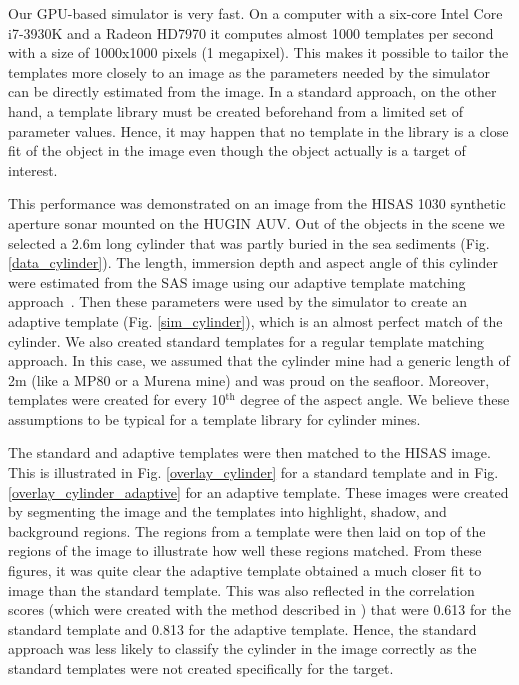 \documentclass[
   UAM                                          %
 , 12pt                                         %
 , bibtex                                       %
 , layout
]{common/mytemplate}
\begin{document}
Our GPU-based simulator is very fast. On a computer with a six-core Intel Core i7-3930K and a Radeon HD7970 it computes almost 1000 templates per second with a size of 1000x1000 pixels (1 megapixel). This makes it possible to tailor the templates more closely to an image as the parameters needed by the simulator can be directly estimated from the image. In a standard approach, on the other hand, a template library must be created beforehand from a limited set of parameter values. Hence, it may happen that no template in the library is a close fit of the object in the image even though the object actually is a target of interest.

This performance was demonstrated on an image from the HISAS 1030 synthetic aperture sonar mounted on the HUGIN AUV. Out of the objects in the scene we selected a 2.6\;m long cylinder that was partly buried in the sea sediments (Fig. \ref{data_cylinder}). The length, immersion depth and aspect angle of this cylinder were estimated from the SAS image using our  adaptive template matching approach~\cite{Midelfart2010}.  Then these parameters were used by the simulator to create an adaptive template (Fig. \ref{sim_cylinder}), which is an almost perfect match of the cylinder. We also created standard templates for a regular template matching approach. In this case, we assumed that the cylinder mine had a generic length of 2\;m (like a MP80 or a Murena mine) and was proud on the seafloor. Moreover, templates were created for every 10$^\text{th}$ degree of the aspect angle. We believe these assumptions to be typical for a template library for cylinder mines. 

The standard and adaptive templates were then matched to the HISAS image. This is illustrated in Fig. \ref{overlay_cylinder} for a standard template and in Fig. \ref{overlay_cylinder_adaptive} for an adaptive template. These images were created by segmenting the image and the templates into highlight, shadow, and background regions. The regions from a template were then laid on top of the regions of the image to illustrate how well these regions matched. From these figures, it was quite clear the adaptive template obtained a much closer fit to image than the standard template. This was also reflected in the correlation scores (which were created with the method described in \cite{Midelfart2010}) that were 0.613 for the standard template and 0.813 for the adaptive template. Hence, the standard approach was less likely to classify the cylinder in the image correctly as the standard templates were not created specifically for the target.
\end{document}
